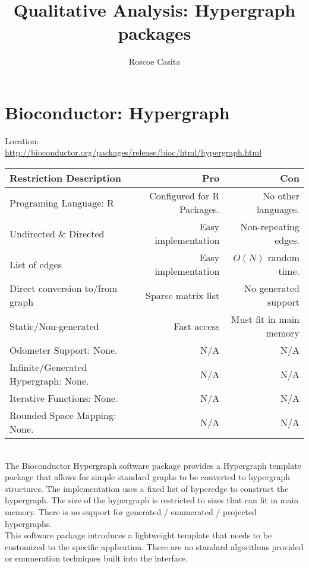 \documentclass{article}
\title{Qualitative Analysis: Hypergraph packages}
\author{Roscoe Casita}
\date{}
\begin{document}
\maketitle

\tableofcontents

\newpage
\section{Bioconductor: Hypergraph}

Location:\\
 \url{http://bioconductor.org/packages/release/bioc/html/hypergraph.html}\\

\begin{tabular}{| l |r | r |}
	\hline
	Restriction Description & Pro & Con \\
	\hline
	Programing Language: R & Configured for R Packages. & No other languages. \\
	Undirected \& Directed & Easy implementation &Non-repeating edges. \\
	List of edges & Easy implementation & $O(N)$ random time.\\
	Direct conversion to/from graph & Sparse matrix list & No generated support \\
	Static/Non-generated & Fast access &Must fit in main memory\\
	\hline
	\hline
	Odometer Support: None. & N/A & N/A \\
	Infinite/Generated Hypergraph: None. & N/A & N/A \\
	Iterative Functions: None. & N/A & N/A \\
	Rounded Space Mapping: None. & N/A & N/A \\
	\hline
\end{tabular}\\


\indent
The Bioconductor Hypergraph software package provides a Hypergraph template package that allows for simple standard graphs to be converted to hypergraph structures. The implementation uses a fixed list of hyperedge to construct the hypergraph. The size of the hypergraph is restricted to sizes that can fit in main memory. There is no support for generated / enumerated / projected hypergraphs. \\

This software package introduces a lightweight template that needs to be customized to the specific application. There are no standard algorithms  provided or enumeration techniques built into the interface.   
\end{document}
